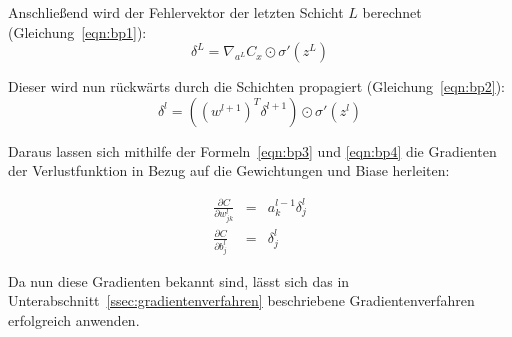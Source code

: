 Anschließend wird der Fehlervektor der letzten Schicht $L$ berechnet (\vgl Gleichung~\ref{eqn:bp1}):
\begin{equation}
\delta^{L}=\nabla_{a^L}C_x\odot\sigma'\left(z^{L}\right)
\end{equation}

Dieser wird nun rückwärts durch die Schichten propagiert (\vgl Gleichung~\ref{eqn:bp2}):
\begin{equation}
\delta^{l}=\left(\left(w^{l+1}\right)^T\delta^{l+1}\right)\odot\sigma'\left(z^{l}\right)
\end{equation}

Daraus lassen sich mithilfe der Formeln~\ref{eqn:bp3} und \ref{eqn:bp4} die Gradienten der Verlustfunktion in Bezug auf die Gewichtungen und Biase herleiten:

\begin{eqnarray}
\frac{\partial C}{\partial w_{jk}^l}&=&a_k^{l-1}\delta_j^l\\
\frac{\partial C}{\partial b_{j}^l}&=&\delta_j^l
\end{eqnarray}

Da nun diese Gradienten bekannt sind, lässt sich das in Unterabschnitt~\ref{ssec:gradientenverfahren} beschriebene Gradientenverfahren erfolgreich anwenden.